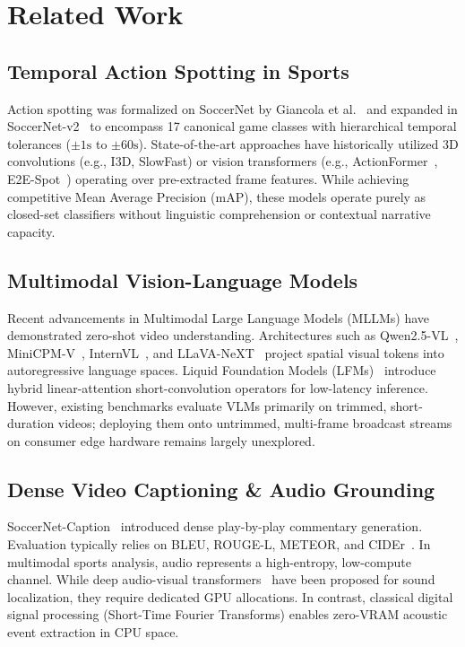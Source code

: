 \documentclass[10pt,twocolumn,letterpaper]{article}
\begin{document}
\section{Related Work}
\label{sec:related}

\subsection{Temporal Action Spotting in Sports}
Action spotting was formalized on SoccerNet by Giancola et al.~\cite{giancola2018soccernet} and expanded in SoccerNet-v2~\cite{deliege2021soccernetv2} to encompass 17 canonical game classes with hierarchical temporal tolerances ($\pm 1\text{s}$ to $\pm 60\text{s}$). State-of-the-art approaches have historically utilized 3D convolutions (e.g., I3D, SlowFast) or vision transformers (e.g., ActionFormer~\cite{zhang2022actionformer}, E2E-Spot~\cite{hong2022e2espot}) operating over pre-extracted frame features. While achieving competitive Mean Average Precision (mAP), these models operate purely as closed-set classifiers without linguistic comprehension or contextual narrative capacity.

\subsection{Multimodal Vision-Language Models}
Recent advancements in Multimodal Large Language Models (MLLMs) have demonstrated zero-shot video understanding. Architectures such as Qwen2.5-VL~\cite{qwen2025qwen25vl}, MiniCPM-V~\cite{openbmb2024minicpmv}, InternVL~\cite{chen2024internvl}, and LLaVA-NeXT~\cite{liu2024llavanext} project spatial visual tokens into autoregressive language spaces. Liquid Foundation Models (LFMs)~\cite{liquid2025lfm} introduce hybrid linear-attention short-convolution operators for low-latency inference. However, existing benchmarks evaluate VLMs primarily on trimmed, short-duration videos; deploying them onto untrimmed, multi-frame broadcast streams on consumer edge hardware remains largely unexplored.

\subsection{Dense Video Captioning \& Audio Grounding}
SoccerNet-Caption~\cite{cioppa2022soccernetcaption} introduced dense play-by-play commentary generation. Evaluation typically relies on BLEU, ROUGE-L, METEOR, and CIDEr~\cite{vedantam2015cider}. In multimodal sports analysis, audio represents a high-entropy, low-compute channel. While deep audio-visual transformers~\cite{owens2018audio,gao2020listen} have been proposed for sound localization, they require dedicated GPU allocations. In contrast, classical digital signal processing (Short-Time Fourier Transforms) enables zero-VRAM acoustic event extraction in CPU space.
\end{document}
